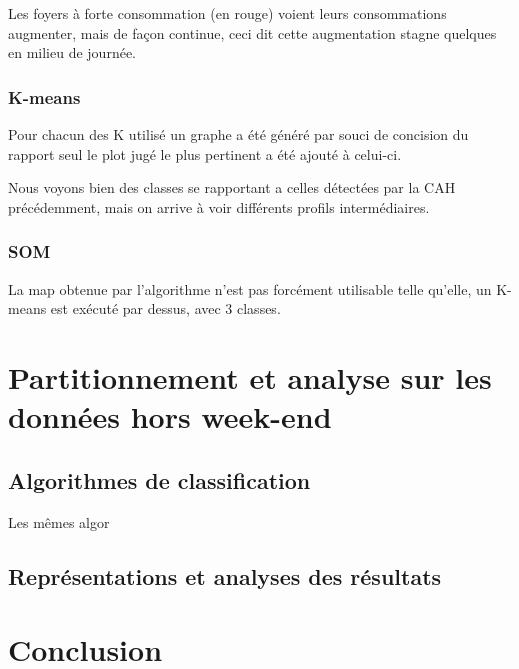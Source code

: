 \documentclass[a4paper,titlepage,12pt]{report}
\begin{document}
			Les foyers à forte consommation (en rouge) voient leurs consommations augmenter, mais de façon continue, ceci dit cette augmentation stagne quelques en milieu de journée.
		
		\subsection{K-means}
			Pour chacun des K utilisé un graphe a été généré par souci de concision du rapport seul le plot jugé le plus pertinent a été ajouté à celui-ci.
			
			
			Nous voyons bien des classes se rapportant a celles détectées par la CAH précédemment, mais on arrive à voir différents profils intermédiaires.
			
		\subsection{SOM}
			La map obtenue par l'algorithme n'est pas forcément utilisable telle qu'elle, un K-means est exécuté par dessus, avec 3 classes.
		
\chapter{Partitionnement et analyse sur les données hors week-end}
	\section{Algorithmes de classification}
		Les mêmes algor
	\section{Représentations et analyses des résultats}
\chapter{Conclusion}
\end{document}
